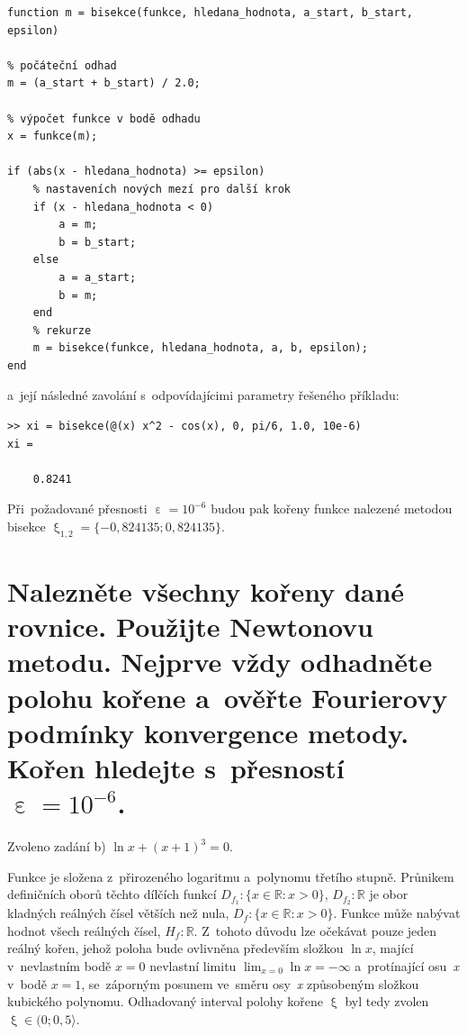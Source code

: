\documentclass[a4paper,10pt]{article}
\def\doubleunderline#1{\underline{\underline{#1}}}
\begin{document}
\begin{verbatim}
function m = bisekce(funkce, hledana_hodnota, a_start, b_start, epsilon)

% počáteční odhad
m = (a_start + b_start) / 2.0;

% výpočet funkce v bodě odhadu
x = funkce(m);

if (abs(x - hledana_hodnota) >= epsilon)
    % nastaveních nových mezí pro další krok
    if (x - hledana_hodnota < 0)
        a = m;
        b = b_start;
    else 
        a = a_start;
        b = m;
    end
    % rekurze
    m = bisekce(funkce, hledana_hodnota, a, b, epsilon);
end
\end{verbatim}

\par a~její následné zavolání s~odpovídajícimi parametry řešeného příkladu:

\begin{verbatim}
>> xi = bisekce(@(x) x^2 - cos(x), 0, pi/6, 1.0, 10e-6)
xi =

    0.8241
\end{verbatim}

\par Při~požadované přesnosti $\upepsilon=10^{-6}$ budou pak kořeny funkce nalezené
metodou bisekce \doubleunderline{$\upxi_{1,2}=\{-0,824135; 0,824135\}$}.


\newpage
\section{Nalezněte všechny kořeny dané rovnice. Použijte Newtonovu metodu. Nejprve vždy
odhadněte polohu kořene a~ověřte Fourierovy podmínky konvergence metody. Kořen hledejte
s~přesností $\upepsilon=10^{-6}$.}

\par Zvoleno zadání b) $\ln{x}+(x+1)^{3}=0$.
\vfill


\par Funkce je složena z~přirozeného logaritmu a~polynomu třetího stupně. Průnikem
definičních oborů těchto dílčích funkcí $D_{f_{1}}: \{x {\in} \mathbb{R}: x>0\}$,
$D_{f_{2}}:\mathbb{R}$ je obor kladných reálných čísel větších než nula,
$D_{f}: \{x {\in} \mathbb{R}: x>0\}$. Funkce může nabývat hodnot všech reálných čísel,
$H_{f}:\mathbb{R}$. Z~tohoto důvodu lze očekávat pouze jeden reálný kořen, jehož poloha
bude ovlivněna především složkou $\ln{x}$, mající v~nevlastním bodě $x=0$ nevlastní limitu
$\lim_{x=0} \ln{x}=-\infty$ a~protínající osu~\emph{x} v~bodě $x=1$, se~záporným posunem
ve~směru osy~\emph{x} způsobeným složkou kubického polynomu. Odhadovaný interval polohy
kořene $\upxi$ byl tedy zvolen $\upxi \in (0; 0,5\rangle$. \\
\end{document}
